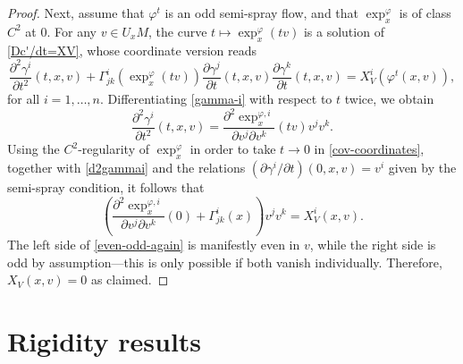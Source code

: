 \documentclass[pdftex]{sigma}
\numberwithin{equation}{section}
\theoremstyle{definition}
\begin{document}
\begin{proof}
Next, assume that $\varphi^t$ is an odd semi-spray flow, and that $\exp_x^{\varphi}$ is of class $C^2$ at $0$.
For any $v\in U_xM$, the curve $t\mapsto \exp_x^{\varphi}(tv)$ is a solution of \eqref{Dc'/dt=XV}, whose coordinate version reads
\begin{equation}\label{cov-coordinates}
 \frac{\partial^2\gamma^i}{\partial t^2}(t,x,v) + \Gamma_{jk}^i(\exp_x^{\varphi}(tv)) \frac{\partial\gamma^j}{\partial t}(t,x,v)\frac{\partial \gamma^k}{\partial t}(t,x,v) = X^i_V(\varphi^t(x,v)),
\end{equation}for all $i=1,\ldots, n$. Differentiating \eqref{gamma-i} with respect to $t$ twice, we obtain
\begin{equation}\label{d2gammai}
 \frac{\partial^2\gamma^i}{\partial t^2}(t,x,v) =
\frac{\partial^2 \exp_x^{\varphi,i}}{\partial v^j\partial v^k}(tv)v^jv^k.\end{equation}Using the $C^2$-regularity of $\exp_x^{\varphi}$ in order to take $t\to 0$ in \eqref{cov-coordinates}, together with \eqref{d2gammai} and the relations $(\partial \gamma^i/\partial t)(0,x,v) = v^i$ given by the semi-spray condition, it follows that
\begin{equation}\label{even-odd-again}
\left( \frac{\partial^2 \exp_x^{\varphi,i}}{\partial v^j\partial v^k}(0)+\Gamma^i_{jk}(x)\right)v^jv^k= X^i_V(x,v).
\end{equation}The left side of \eqref{even-odd-again} is manifestly even in $v$, while the right side is odd by assumption---this is only possible if both vanish individually. Therefore, $X_V(x,v)=0$ as claimed.
\end{proof}


\section{Rigidity results}\label{sec:rigidity}
\end{document}
